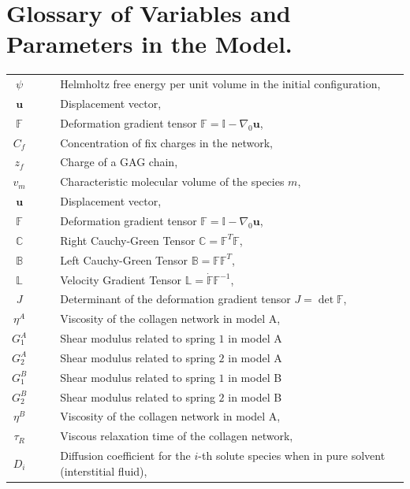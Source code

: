 \documentclass[runningheads]{llncs}
\newcommand{\F}{\ensuremath{\mathbb{F}}}
\newcommand{\LL}{\ensuremath{\mathbb{L}}}
\begin{document}
%


\newpage
\appendix
\section{Glossary of Variables and Parameters in the Model.}
\begin{table}[h!]
\begin{tabular}{c  l}
	$\psi\qquad $ & Helmholtz free energy per unit volume in the initial configuration,\\
	$\mathbf{u}\qquad$ & Displacement vector,\\
	$\F\qquad$ & Deformation gradient tensor $\F=\mathbb{I}-\nabla_0\mathbf{u}$,\\
	$C_f\qquad$ & Concentration of fix charges in the network,\\
	$z_f\qquad$ & Charge of a GAG chain,\\
	$v_m\qquad$ & Characteristic molecular volume of the species $m$,\\
	$\mathbf{u}\qquad$ & Displacement vector,\\
	$\F\qquad$ & Deformation gradient tensor $\F=\mathbb{I}-\nabla_0\mathbf{u}$,\\	
	$\mathbb{C}\qquad$ & Right Cauchy-Green Tensor $\mathbb{C}=\F^T\F$,\\
	$\mathbb{B}\qquad$ & Left Cauchy-Green Tensor $\mathbb{B}=\F\F^T$,\\
	$\LL\qquad$ & Velocity Gradient Tensor $\LL=\dot{\F}\F^{-1}$,\\
	$J\qquad$ & Determinant of the deformation gradient tensor $J=\det \F$,\\
	$\eta^A\qquad $ & Viscosity of the collagen network in model A,\\
	$G^A_1\qquad$ & Shear modulus related to spring $1$ in model A\\
	$G^A_2\qquad$ & Shear modulus related to spring $2$ in model A\\
	$G^B_1\qquad$ & Shear modulus related to spring $1$ in model B\\
	$G^B_2\qquad$ & Shear modulus related to spring $2$ in model B\\
	$\eta^B\qquad$ & Viscosity of the collagen network in model A,\\
	$\tau_R\qquad$ & Viscous relaxation time of the collagen network,\\
	$D_i\qquad$ & Diffusion coefficient for the $i$-th solute species when in pure solvent (interstitial fluid),\\

\end{tabular}
\end{table}
\end{document}
